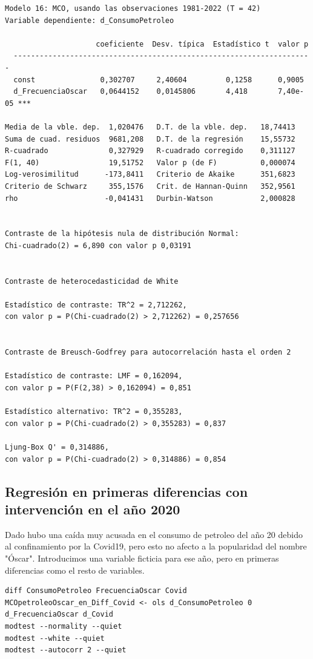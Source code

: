 \documentclass[10pt]{article}
\begin{document}
\begin{verbatim}
Modelo 16: MCO, usando las observaciones 1981-2022 (T = 42)
Variable dependiente: d_ConsumoPetroleo

                     coeficiente  Desv. típica  Estadístico t  valor p 
  ---------------------------------------------------------------------
  const               0,302707     2,40604         0,1258      0,9005  
  d_FrecuenciaOscar   0,0644152    0,0145806       4,418       7,40e-05 ***

Media de la vble. dep.  1,020476   D.T. de la vble. dep.   18,74413
Suma de cuad. residuos  9681,208   D.T. de la regresión    15,55732
R-cuadrado              0,327929   R-cuadrado corregido    0,311127
F(1, 40)                19,51752   Valor p (de F)          0,000074
Log-verosimilitud      -173,8411   Criterio de Akaike      351,6823
Criterio de Schwarz     355,1576   Crit. de Hannan-Quinn   352,9561
rho                    -0,041431   Durbin-Watson           2,000828


Contraste de la hipótesis nula de distribución Normal:
Chi-cuadrado(2) = 6,890 con valor p 0,03191


Contraste de heterocedasticidad de White

Estadístico de contraste: TR^2 = 2,712262,
con valor p = P(Chi-cuadrado(2) > 2,712262) = 0,257656


Contraste de Breusch-Godfrey para autocorrelación hasta el orden 2

Estadístico de contraste: LMF = 0,162094,
con valor p = P(F(2,38) > 0,162094) = 0,851

Estadístico alternativo: TR^2 = 0,355283,
con valor p = P(Chi-cuadrado(2) > 0,355283) = 0,837

Ljung-Box Q' = 0,314886,
con valor p = P(Chi-cuadrado(2) > 0,314886) = 0,854
\end{verbatim}
\subsection*{Regresión en primeras diferencias con intervención en el año 2020}
\label{sec:orgaaef73c}
Dado hubo una caída muy acusada en el consumo de petroleo del año 20
debido al confinamiento por la Covid19, pero esto no afecto a la
popularidad del nombre "Óscar". Introducimos una variable ficticia
para ese año, pero en primeras diferencias como el resto de variables.

\begin{verbatim}
diff ConsumoPetroleo FrecuenciaOscar Covid
MCOpetroleoOscar_en_Diff_Covid <- ols d_ConsumoPetroleo 0 d_FrecuenciaOscar d_Covid
modtest --normality --quiet
modtest --white --quiet
modtest --autocorr 2 --quiet
\end{verbatim}
\end{document}
